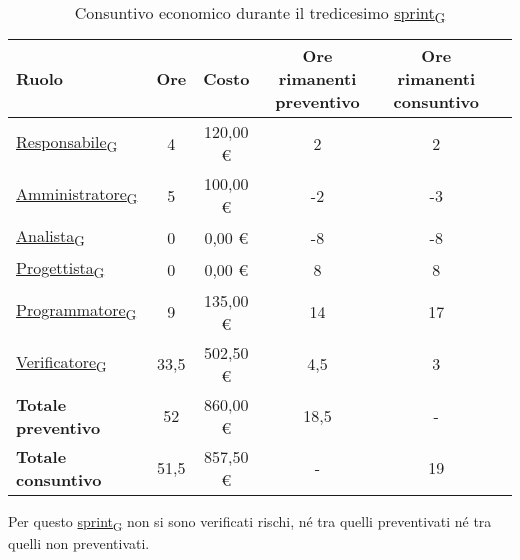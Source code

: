 \newpage
{}
\begin{table}[!h]
    \centering
    \begin{tabular}{ | l | c | c | c | c | c | }
        \hline
        \textbf{Ruolo} & \textbf{Ore} & \textbf{Costo} & \textbf{Ore rimanenti preventivo} & \textbf{Ore rimanenti consuntivo} \\
        \hline
        \href{https://7last.github.io/docs/pb/documentazione-interna/glossario\#responsabile}{Responsabile\textsubscript{G}}     &  4   &  120,00 € &   2   &   2   \\
        \href{https://7last.github.io/docs/pb/documentazione-interna/glossario\#amministratore}{Amministratore\textsubscript{G}} &  5   &  100,00 € &  -2   &  -3   \\
        \href{https://7last.github.io/docs/pb/documentazione-interna/glossario\#analista}{Analista\textsubscript{G}}             &  0   &    0,00 € &  -8   &  -8   \\
        \href{https://7last.github.io/docs/pb/documentazione-interna/glossario\#progettista}{Progettista\textsubscript{G}}       &  0   &    0,00 € &   8   &   8   \\
        \href{https://7last.github.io/docs/pb/documentazione-interna/glossario\#programmatore}{Programmatore\textsubscript{G}}   &  9   &  135,00 € &  14   &  17   \\
        \href{https://7last.github.io/docs/pb/documentazione-interna/glossario\#verificatore}{Verificatore\textsubscript{G}}     & 33,5 &  502,50 € &   4,5 &   3   \\
        \hline
        \textbf{Totale preventivo} & 52   &  860,00 € &  18,5 &   -   \\
        \hline
        \textbf{Totale consuntivo} & 51,5 &  857,50 € &   -   &  19   \\
        \hline
    \end{tabular}
    \caption{Consuntivo economico durante il tredicesimo \href{https://7last.github.io/docs/pb/documentazione-interna/glossario\#sprint}{sprint\textsubscript{G}}}
\end{table}

Per questo \href{https://7last.github.io/docs/pb/documentazione-interna/glossario\#sprint}{sprint\textsubscript{G}} non si sono verificati rischi, né tra quelli preventivati né tra quelli non preventivati.

